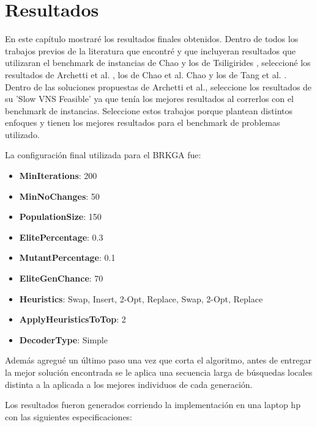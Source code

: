 \chapter{Resultados}


En este capítulo mostraré los resultados finales obtenidos. Dentro de todos los trabajos previos de la literatura que encontré y que incluyeran resultados que utilizaran el benchmark de instancias de Chao y los de Tsiligirides \cite{IntancesChaoTsiligirides}, seleccioné los resultados de Archetti et al. \cite{ArchettiHertzSperanza}, los de Chao et al. Chao \cite{ChaoGoldenWasil} y los de Tang et al. \cite{TangMillerHooks}. Dentro de las soluciones propuestas de Archetti et al., seleccione los resultados de su 'Slow VNS Feasible' ya que tenía los mejores resultados al correrlos con el benchmark de instancias. Seleccione estos trabajos porque plantean distintos enfoques y tienen los mejores resultados para el benchmark de problemas utilizado.

\bigskip

La configuración final utilizada para el BRKGA fue:

\begin{itemize}
  \item \textbf{MinIterations}: 200
  \item \textbf{MinNoChanges}: 50
  \item \textbf{PopulationSize}: 150
  \item \textbf{ElitePercentage}: 0.3 
  \item \textbf{MutantPercentage}: 0.1
  \item \textbf{EliteGenChance}: 70 
  \item \textbf{Heuristics}: Swap, Insert, 2-Opt, Replace, Swap, 2-Opt, Replace
  \item \textbf{ApplyHeuristicsToTop}: 2
  \item \textbf{DecoderType}: Simple
\end{itemize}

Además agregué un último paso una vez que corta el algoritmo, antes de entregar la mejor solución encontrada se le aplica una secuencia larga de búsquedas locales distinta a la aplicada a los mejores individuos de cada generación.

\bigskip

Los resultados fueron generados corriendo la implementación en una laptop hp con las siguientes especificaciones:

